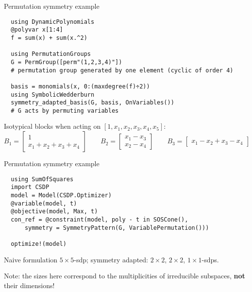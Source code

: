 \begin{frame}[fragile]{Permutation symmetry example}
\footnotesize
\begin{verbatim}
  using DynamicPolynomials
  @polyvar x[1:4]
  f = sum(x) + sum(x.^2)

  using PermutationGroups
  G = PermGroup([perm"(1,2,3,4)"])
  # permutation group generated by one element (cyclic of order 4)

  basis = monomials(x, 0:(maxdegree(f)÷2))
  using SymbolicWedderburn
  symmetry_adapted_basis(G, basis, OnVariables())
  # G acts by permuting variables
\end{verbatim}

Isotypical blocks when acting on $[1, x_1, x_2, x_3, x_4, x_5]$:
\[
  B_1 = \begin{bmatrix}
          1\\
          x_1 + x_2 + x_3 + x_4
        \end{bmatrix}
  \qquad
  B_2 = \begin{bmatrix}
          x_1 - x_3\\
          x_2 - x_4
        \end{bmatrix}
  \qquad
  B_3 = \begin{bmatrix}
          x_1 - x_2 + x_3 - x_4
        \end{bmatrix}
\]
\end{frame}

\begin{frame}[fragile]{Permutation symmetry example}
\footnotesize
\begin{verbatim}
  using SumOfSquares
  import CSDP
  model = Model(CSDP.Optimizer)
  @variable(model, t)
  @objective(model, Max, t)
  con_ref = @constraint(model, poly - t in SOSCone(), 
      symmetry = SymmetryPattern(G, VariablePermutation())) 

  optimize!(model)
\end{verbatim}

\normalsize
Naive formulation $5\times 5$-sdp; symmetry adapted: $2\times 2$, $2\times 2$, $1\times 1$-sdps.

Note: the sizes here correspond to the multiplicities of irreducible subspaces, \textbf{not} their dimensions!

\end{frame}

